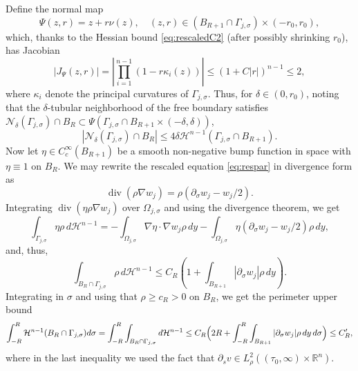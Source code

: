\documentclass[11pt]{article}
\numberwithin{equation}{section}
\theoremstyle{definition}
\newcommand{\RR}{\mathbb{R}}
\begin{document}
Define the normal map
\begin{equation*}
    \Psi(z,r)=z+r \nu(z), \quad (z,r)\in (B_{R+1}\cap \Gamma_{j,\sigma}) \times (-r_0,r_0),
\end{equation*}
which, thanks to the Hessian bound \eqref{eq:rescaledC2} (after possibly shrinking $r_0$), has Jacobian
\begin{equation*}
|J_{\Psi}(z,r)|=\left|\prod_{i=1}^{n-1}(1-r\kappa_i(z))\right|\leq (1+C|r|)^{n-1}\leq 2,
\end{equation*}
where $\kappa_i$ denote the principal curvatures of $\Gamma_{j,\sigma}$. Thus, for $\delta \in (0,r_0)$, noting that the $\delta$-tubular neighborhood of the free boundary satisfies $\mathcal{N}_{\delta}(\Gamma_{j,\sigma})\cap B_R\subset \Psi(\Gamma_{j,\sigma}\cap B_{R+1} \times (-\delta,\delta))$,
\begin{equation}\label{eq:tube-meas}
|\mathcal{N}_{\delta}(\Gamma_{j,\sigma})\cap B_R |\leq  4\delta \mathcal{H}^{n-1}(\Gamma_{j,\sigma}\cap B_{R+1}).
\end{equation}
Now let $\eta \in C^{\infty}_c(B_{R+1})$ be a smooth non-negative bump function in space with $\eta \equiv 1$ on $B_R$. We may rewrite the rescaled equation \eqref{eq:respar} in divergence form as
\begin{equation*}
    \operatorname{div}(\rho \nabla w_j)=\rho (\partial_{\sigma}w_j-w_j/2).
\end{equation*}
Integrating $\operatorname{div}(\eta \rho \nabla w_j)$ over $\Omega_{j,\sigma}$ and using the divergence theorem, we get
\begin{equation*}
    \int_{\Gamma_{j,\sigma}}\eta \rho \, d\mathcal{H}^{n-1}=- \int_{\Omega_{j,\sigma}}\nabla \eta \cdot \nabla w_j \rho\, dy - \int_{\Omega_{j,\sigma}} \eta (\partial_{\sigma}w_j -w_j/2)\rho \,dy,
\end{equation*}
and, thus, 
\begin{equation*}
 \int_{B_R\cap \Gamma_{j,\sigma}} \rho\, d\mathcal{H}^{n-1} \leq C_R(1+ \int_{B_{R+1}}|\partial_{\sigma}w_j|\rho \, dy).
\end{equation*}
Integrating in $\sigma$ and using that $\rho \geq c_R>0$ on $B_R$, we get the perimeter upper bound
\begin{equation}\label{eq:spacetime-area}
   \int_{-R}^R \mathcal{H}^{n-1}(B_R \cap \Gamma_{j,\sigma})d\sigma =\int_{-R}^{R} \int_{B_R\cap \Gamma_{j,\sigma}}  d\mathcal{H}^{n-1} \leq C_R\Bigl(2R+ \int_{-R}^{R}\int_{B_{R+1}}|\partial_{\sigma}w_j|\rho\, dy\, d\sigma\Bigr)\leq C'_R,
\end{equation}
where in the last inequality we used the fact that $\partial_s v \in L^2_{\rho}((\tau_0,\infty)\times \RR^n)$.
\end{document}
